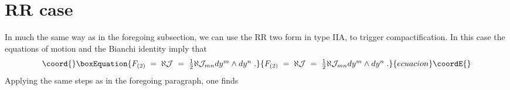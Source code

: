 \documentclass[a4paper,11pt]{article}
\begin{document}
\section{RR case}
\label{sec:RR2}
In much the same way as in the foregoing subsection, we can use the
RR two form in type IIA, to trigger compactification. In this case
the equations of motion and the Bianchi identity imply that 
\begin{equation}\coord{}\boxEquation{
 F_{(2)} \;=\; \aleph \mathcal{J} 
         \;=\; \textstyle{\frac{1}{2}} \aleph
               \mathcal{J}_{mn} dy^{m}\wedge dy^{n} \; .
\label{eq:F2Ansatz}
}{
 F_{(2)} \;=\; \aleph \mathcal{J} 
         \;=\; \textstyle{\frac{1}{2}} \aleph
               \mathcal{J}_{mn} dy^{m}\wedge dy^{n} \; .
}{ecuacion}\coordE{}\end{equation}
Applying the same steps as in the foregoing paragraph, one finds
\end{document}
